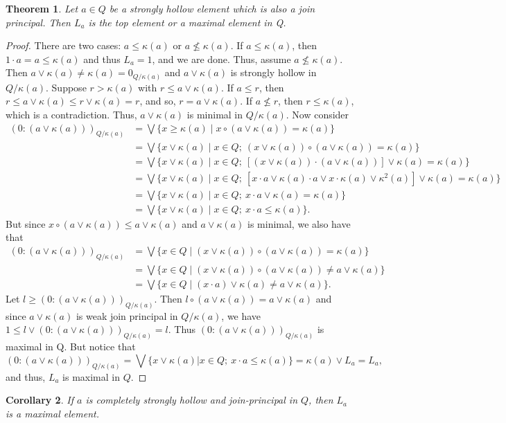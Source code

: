 \documentclass[11pt,english]{amsart}
\newtheorem{theorem}{Theorem}[section]
\newtheorem{corollary}[theorem]{Corollary}
\theoremstyle{definition}
\numberwithin{equation}{section}
\theoremstyle{remark}
\def\leq{\leqslant}
\begin{document}
	\begin{theorem}
		Let $a\in Q$ be a strongly hollow element which is also a join principal. Then $L_a$ is the top element or a maximal element in Q.
	\end{theorem}
	
	\begin{proof}
		There are two cases: $a\leq \kappa(a)$ or $a\nleq\kappa(a)$. If $a\leq\kappa(a)$, then \(1\cdot a=a\leq\kappa(a)\) and thus $L_a=1$, and we are done. Thus, assume $a\nleq \kappa(a)$. Then $a\vee\kappa(a)\neq\kappa(a)=0_{Q/\kappa(a)}$ and $a\vee\kappa(a)$ is strongly hollow in $Q/\kappa(a)$. Suppose $r>\kappa(a)$ with $r\leq a\vee\kappa(a)$. If $a\leq r$, then $r\leq a\vee\kappa(a)\leq r\vee\kappa(a)=r$, and so, $r=a\vee\kappa(a)$. If $a\nleq r$, then $r\leq\kappa(a)$, which is a contradiction. Thus, $a\vee\kappa(a)$ is minimal in $Q/\kappa(a)$. Now consider  
		\begin{align*}
			(0:(a\vee\kappa(a)))_{Q/\kappa(a)}&=\bigvee\{x\geqslant\kappa(a)\mid  x\circ(a\vee\kappa(a))=\kappa(a)\} \\
			&=\bigvee\{x\vee\kappa(a)\mid x\in Q;\: (x\vee\kappa(a))\circ(a\vee\kappa(a))=\kappa(a)\} \\
			&=\bigvee\{x\vee\kappa(a)\mid x\in Q;\: [(x\vee\kappa(a))\cdot(a\vee\kappa(a))]\vee\kappa(a)=\kappa(a)\} \\
			&=\bigvee\{x\vee\kappa(a)\mid x\in Q;\: [x\cdot a\vee\kappa(a)\cdot a\vee x\cdot\kappa(a)\vee\kappa^2(a)]\vee\kappa(a)=\kappa(a)\} \\
			&=\bigvee\{x\vee\kappa(a)\mid x\in Q;\: x\cdot a\vee\kappa(a)=\kappa(a)\}\\
			&=\bigvee\{x\vee\kappa(a)\mid x\in Q;\: x\cdot a\leq\kappa(a)\}.   
		\end{align*}
		But since $x\circ( a\vee\kappa(a))\leq a\vee\kappa(a)$ and $a\vee\kappa(a)$ is minimal, we also have that
		\begin{align*}
			(0:(a\vee\kappa(a)))_{Q/\kappa(a)}&=\bigvee\{x\in Q\mid  (x\vee\kappa(a))\circ(a\vee\kappa(a))=\kappa(a)\}\\&=\bigvee\{x\in Q\mid  (x\vee\kappa(a))\circ(a\vee\kappa(a))\neq a\vee\kappa(a)\}\\
			&=\bigvee\{x\in Q\mid  (x\cdot a)\vee \kappa(a)\neq a\vee\kappa(a)\}.
		\end{align*}
		Let $l\geqslant (0:(a\vee\kappa(a)))_{Q/\kappa(a)}$. Then $l\circ (a\vee\kappa(a))=a\vee\kappa(a)$ and since $a\vee\kappa(a)$ is weak join principal in $Q/\kappa(a)$, we have $1\leq l\vee (0:(a\vee\kappa(a)))_{Q/\kappa(a)}=l$. Thus $(0:(a\vee\kappa(a)))_{Q/\kappa(a)}$ is maximal in Q. But notice that \[(0:(a\vee\kappa(a)))_{Q/\kappa(a)}=\bigvee\{x\vee\kappa(a)|x\in Q;\: x\cdot a\leq\kappa(a)\}=\kappa(a)\vee L_a=L_a,\] and thus, $L_a$ is maximal in $Q$.
	\end{proof}
	\begin{corollary}
		If $a$ is completely strongly hollow and join-principal in $Q$, then $L_a$ is a maximal element.
	\end{corollary}
	
\end{document}
